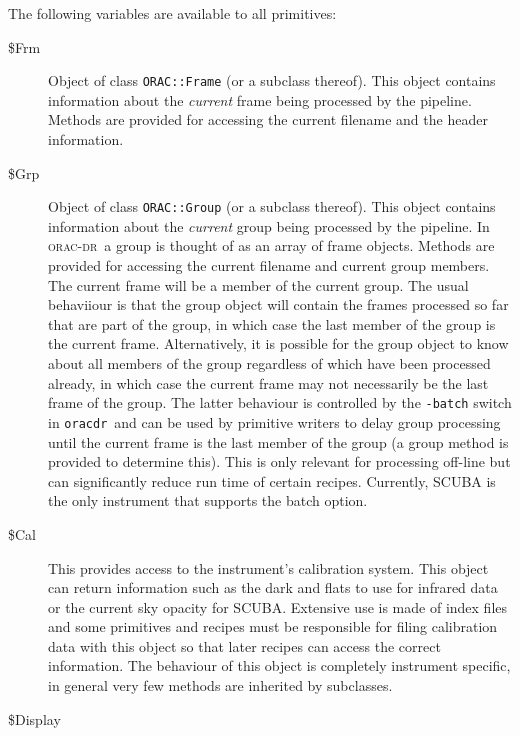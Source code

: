 \documentclass[twoside,11pt]{article}
\renewcommand{\_}{\texttt{\symbol{95}}}
\newcommand{\Oracdr}{\textsc{orac-dr}}
\newcommand{\oracdr}{\texttt{oracdr}}
\begin{document}
The following variables are available to all primitives:

\begin{description}
\item[\$Frm] \mbox{} %

  Object of class \texttt{ORAC::Frame} (or a subclass thereof). This
object contains information about the \emph{current} frame being
processed by the pipeline. Methods are provided for accessing the
current filename and the header information.

\item[\$Grp] \mbox{} %

Object of class \texttt{ORAC::Group} (or a subclass thereof). This
object contains information about the \emph{current} group being
processed by the pipeline. In \Oracdr\ a group is thought of as an
array of frame objects. Methods are provided for accessing the current
filename and current group members. The current frame will be a member
of the current group. The usual behaviiour is that the group object
will contain the frames processed so far that are part of the group,
in which case the last member of the group is the current frame.
Alternatively, it is possible for the group object to know about all
members of the group regardless of which have been processed already,
in which case the current frame may not necessarily be the last frame of
the group. The latter behaviour is controlled by the \texttt{-batch}
switch in \oracdr\ and can be used by primitive writers to delay group 
processing until the current frame is the last member of the group (a
group method is provided to determine this). This is only relevant for 
processing off-line but can significantly reduce run time of certain
recipes. Currently, SCUBA is the
only instrument that supports the batch option.

\item[\$Cal] \mbox{} %

This provides access to the instrument's calibration system. This object
can return information such as the dark and flats to use for infrared
data or the current sky opacity for SCUBA. Extensive use is made of
index files and some primitives and recipes  must be responsible
for filing calibration data with this object so that later recipes
can access the correct information. The behaviour of this object is 
completely instrument specific, in general very few methods are
inherited by subclasses.

\item[\$Display] \mbox{} %


\end{description}
\end{document}
